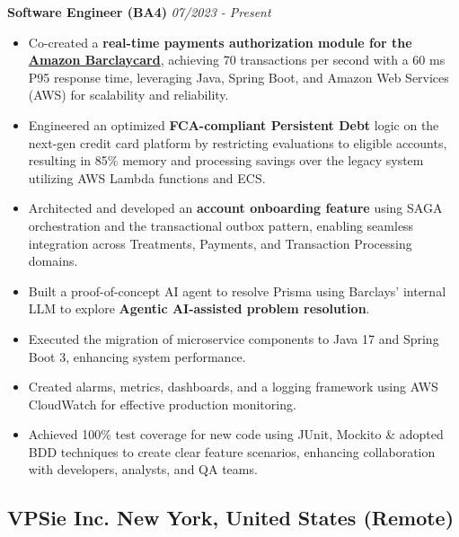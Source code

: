 \documentclass[a4,10pt]{article}
\newenvironment{zitemize}{
\begin{itemize}\itemsep0pt \parskip0pt \parsep1pt}
{\end{itemize}\vspace{-0.5cm}}
\begin{document}
\textbf{Software Engineer (BA4)} \hfill \textit{07/2023 - Present} \\
\vspace{-5pt}
\begin{zitemize}
    \item Co-created a \textbf{real-time payments authorization module for the \href{https://www.amazon.co.uk/dp/B0BH98211K}{Amazon Barclaycard}}, achieving 70 transactions per second with a 60 ms P95 response time, leveraging Java, Spring Boot, and Amazon Web Services (AWS) for scalability and reliability.
    \item Engineered an optimized \textbf{FCA-compliant Persistent Debt} logic on the next-gen credit card platform by restricting evaluations to eligible accounts, resulting in 85\% memory and processing savings over the legacy system utilizing AWS Lambda functions and ECS.
    \item Architected and developed an \textbf{account onboarding feature} using SAGA orchestration and the transactional outbox pattern, enabling seamless integration across Treatments, Payments, and Transaction Processing domains.

    \item Built a proof-of-concept AI agent to resolve Prisma using Barclays’ internal LLM to explore \textbf{Agentic AI-assisted problem resolution}.
    \item Executed the migration of microservice components to Java 17 and Spring Boot 3, enhancing system performance.
    \item Created alarms, metrics, dashboards, and a logging framework using AWS CloudWatch for effective production monitoring.
    \item Achieved 100\% test coverage for new code using JUnit, Mockito \& adopted BDD techniques to create clear feature scenarios, enhancing collaboration with developers, analysts, and QA teams.
\end{zitemize}


\subsection*{VPSie Inc. \hfill {\normalsize\normalfont New York, United States (Remote)}}
\end{document}

